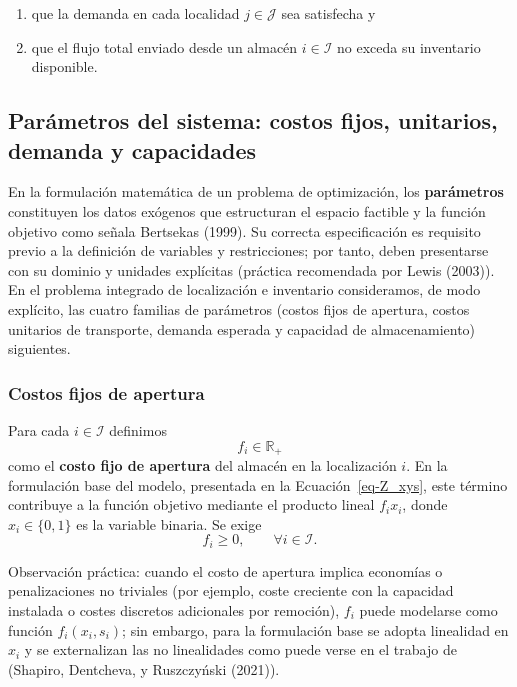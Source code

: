 \documentclass[
  spanish,
  us-letterpaper,
]{scrreprt}
\providecommand{\tightlist}{%
  \setlength{\itemsep}{0pt}\setlength{\parskip}{0pt}}
\numberwithin{equation}{section}
\begin{document}
\begin{enumerate}
\def\labelenumi{(\roman{enumi})}
\tightlist
\item
  que la demanda en cada localidad \(j \in \mathcal{J}\) sea satisfecha
  y
\item
  que el flujo total enviado desde un almacén \(i \in \mathcal{I}\) no
  exceda su inventario disponible.
\end{enumerate}

\subsection{Parámetros del sistema: costos fijos, unitarios, demanda y
capacidades}\label{paruxe1metros-del-sistema-costos-fijos-unitarios-demanda-y-capacidades}

En la formulación matemática de un problema de optimización, los
\textbf{parámetros} constituyen los datos exógenos que estructuran el
espacio factible y la función objetivo como señala Bertsekas (1999). Su
correcta especificación es requisito previo a la definición de variables
y restricciones; por tanto, deben presentarse con su dominio y unidades
explícitas (práctica recomendada por Lewis (2003)). En el problema
integrado de localización e inventario consideramos, de modo explícito,
las cuatro familias de parámetros (costos fijos de apertura, costos
unitarios de transporte, demanda esperada y capacidad de almacenamiento)
siguientes.

\subsubsection{Costos fijos de apertura}\label{costos-fijos-de-apertura}

Para cada \(i\in\mathcal{I}\) definimos \[
f_i \in \mathbb{R}_{+}
\] como el \textbf{costo fijo de apertura} del almacén en la
localización \(i\). En la formulación base del modelo, presentada en la
Ecuación~\ref{eq-Z_xys}, este término contribuye a la función objetivo
mediante el producto lineal \(f_i x_i\), donde \(x_i \in \{0,1\}\) es la
variable binaria. Se exige\\
\[
f_i \ge 0, \qquad \forall i \in \mathcal{I}.
\]

Observación práctica: cuando el costo de apertura implica economías o
penalizaciones no triviales (por ejemplo, coste creciente con la
capacidad instalada o costes discretos adicionales por remoción),
\(f_i\) puede modelarse como función \(f_i(x_i,s_i)\); sin embargo, para
la formulación base se adopta linealidad en \(x_i\) y se externalizan
las no linealidades como puede verse en el trabajo de (Shapiro,
Dentcheva, y Ruszczyński (2021)).
\end{document}
